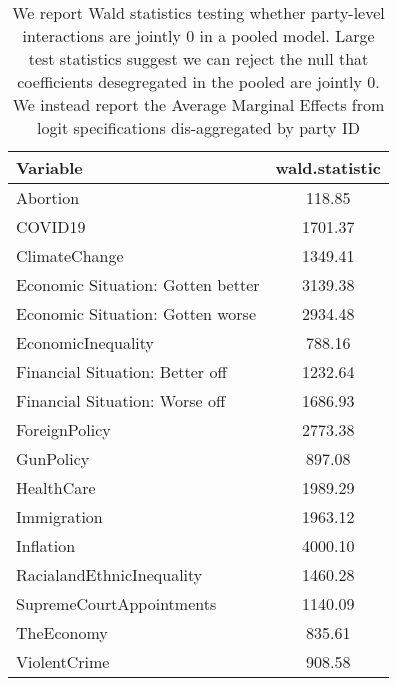 \begin{table}[ht]
\centering
\begin{tabular}{lc}
  \hline
Variable & wald.statistic \\ 
  \hline
Abortion & 118.85 \\ 
  COVID19 & 1701.37 \\ 
  ClimateChange & 1349.41 \\ 
  Economic Situation: Gotten better & 3139.38 \\ 
  Economic Situation: Gotten worse & 2934.48 \\ 
  EconomicInequality & 788.16 \\ 
  Financial Situation: Better off & 1232.64 \\ 
  Financial Situation: Worse off & 1686.93 \\ 
  ForeignPolicy & 2773.38 \\ 
  GunPolicy & 897.08 \\ 
  HealthCare & 1989.29 \\ 
  Immigration & 1963.12 \\ 
  Inflation & 4000.10 \\ 
  RacialandEthnicInequality & 1460.28 \\ 
  SupremeCourtAppointments & 1140.09 \\ 
  TheEconomy & 835.61 \\ 
  ViolentCrime & 908.58 \\ 
   \hline
\end{tabular}
\caption{We report Wald statistics testing whether party-level interactions are jointly 0 in a pooled model. Large test statistics suggest we can reject the null that coefficients desegregated in the pooled are jointly 0. We instead report the  Average Marginal Effects from logit specifications dis-aggregated by party ID} 
\label{tab: waldtests}
\end{table}
